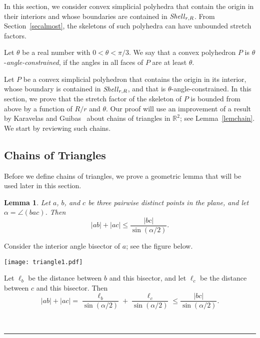 \documentclass[12pt]{article}
\newtheorem{lemma}{Lemma}
\newcommand{\IR}{\mathbb{R}}
\newcommand{\Shell}{\mathord{\it Shell}}
\newcommand{\qed}{\rule{0.5em}{1.5ex}}
\newcommand{\fqed}{{\hfill~\qed}}
\newenvironment{proof}{{\noindent \bf Proof.}}
                      {{\hfill \fqed} \vspace{1em}}
\begin{document}
In this section, we consider convex simplicial polyhedra that contain 
the origin in their interiors and whose boundaries are contained in 
$\Shell_{r,R}$. From Section~\ref{secalmost}, the skeletons of such 
polyhedra can have unbounded stretch factors. 

Let $\theta$ be a real number with $0 < \theta < \pi/3$. We say that a 
convex polyhedron $P$ is $\theta$-\emph{angle-constrained}, if the 
angles in all faces of $P$ are at least $\theta$. 

Let $P$ be a convex simplicial polyhedron that contains the origin in 
its interior, whose boundary is contained in $\Shell_{r,R}$, and that is 
$\theta$-angle-constrained. In this section, we prove that the stretch 
factor of the skeleton of $P$ is bounded from above by a function of 
$R/r$ and $\theta$. Our proof will use an improvement of a result by 
Karavelas and Guibas~\cite{kg-skgsa-01} about chains of triangles in 
$\IR^2$; see Lemma~\ref{lemchain}. We start by reviewing such chains.  


\subsection{Chains of Triangles}  \label{secCoT} 
Before we define chains of triangles, we prove a geometric lemma that 
will be used later in this section. 

\begin{lemma}  \label{lemtriangle}  
Let $a$, $b$, and $c$ be three pairwise distinct points in the plane, 
and let $\alpha = \angle(bac)$. Then 
\[ |ab| + |ac| \leq \frac{|bc|}{\sin (\alpha/2)} .
\] 
\end{lemma} 
\begin{proof} 
Consider the interior angle bisector of $a$; see the figure below. 

\begin{center}
\texttt{[image: triangle1.pdf]}
\end{center}

Let $\ell_b$ be the distance between $b$ and this bisector, and let 
$\ell_c$ be the distance between $c$ and this bisector. Then 
\[ |ab| + |ac| = \frac{\ell_b}{\sin(\alpha/2)} + 
                 \frac{\ell_c}{\sin(\alpha/2)} 
  \leq \frac{|bc|}{\sin(\alpha/2)} . 
\]
\end{proof} 
\end{document}
